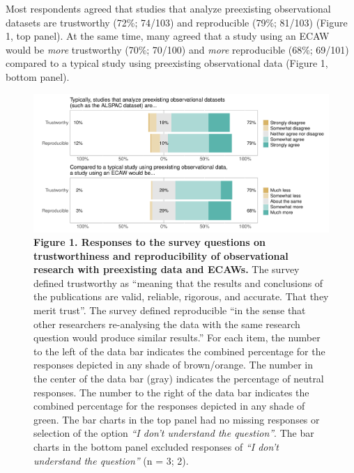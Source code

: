 \documentclass[
  man,floatsintext]{apa6}
\begin{document}
Most respondents agreed that studies that analyze preexisting observational datasets are trustworthy (72\%; 74/103) and reproducible (79\%; 81/103) (Figure 1, top panel). At the same time, many agreed that a study using an ECAW would be \emph{more} trustworthy (70\%; 70/100) and \emph{more} reproducible (68\%; 69/101) compared to a typical study using preexisting observational data (Figure 1, bottom panel).

\begin{figure}[H]

{\centering \includegraphics[width=1\linewidth]{figs/typicallyEcawPlot-1} 

}

\caption{\textbf{Figure 1. Responses to the survey questions on trustworthiness and reproducibility of observational research with preexisting data and ECAWs.} The survey defined trustworthy as ``meaning that the results and conclusions of the publications are valid, reliable, rigorous, and accurate. That they merit trust''. The survey defined reproducible ``in the sense that other researchers re-analysing the data with the same research question would produce similar results.'' For each item, the number to the left of the data bar indicates the combined percentage for the responses depicted in any shade of brown/orange. The number in the center of the data bar (gray) indicates the percentage of neutral responses. The number to the right of the data bar indicates the combined percentage for the responses depicted in any shade of green. The bar charts in the top panel had no missing responses or selection of the option \emph{``I don't understand the question''}. The bar charts in the bottom panel excluded responses of \emph{``I don't understand the question''} (n = 3; 2).}\label{fig:typicallyEcawPlot}
\end{figure}

{\smaller[1] \singlespacing



}
\end{document}
